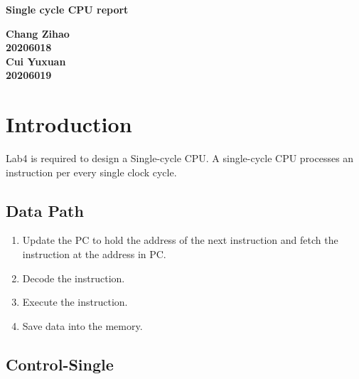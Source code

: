 \documentclass[12pt,a4paper]{article}
\begin{document}
\begin{titlepage}
  \begin{center}
    \vspace*{1cm}

    \textbf{\Huge Single cycle CPU  report}

    \vspace{0.5cm}

         
    \vspace{1.5cm}

    \textbf{\large Chang Zihao \\20206018\\\large Cui Yuxuan\\20206019}

    \vfill
         

         
    \vspace{0.8cm}
  


         
\end{center}
\end{titlepage}


\newpage
\tableofcontents
\thispagestyle{empty}

\newpage
{}
\setcounter{page}{1}

\section{Introduction}

Lab4 is required to design a Single-cycle CPU.
A single-cycle CPU processes an instruction per every single clock cycle.

\subsection{Data Path}

\begin{enumerate}
\item Update the PC to hold the address of the next instruction and fetch the instruction at the address in PC.
\item Decode the instruction.
\item Execute the instruction.
\item Save data into the memory.
\end{enumerate}

\subsection{Control-Single}
\end{document}
